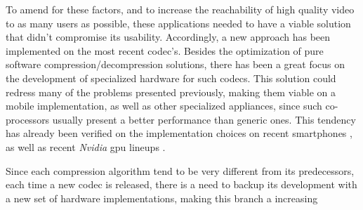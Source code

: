To amend for these factors, and to increase the reachability of high quality video to as many users as possible, these applications needed to have a viable solution that didn't compromise its usability. Accordingly, a new approach has been implemented on the most recent codec's. Besides the optimization of pure software compression/decompression solutions, there has been a great focus on the development of specialized hardware for such codecs. This solution could redress many of the problems presented previously, making them viable on a mobile implementation, as well as other specialized appliances, since such co-processors usually present a better performance than generic ones. This tendency has already been verified on the implementation choices on recent smartphones \cite[p.~14]{scientiamobileMobileOverviewReport}, as well as recent \textit{Nvidia} \gls{gpu} lineups \cite{VideoEncodeDecode2016}.



Since each compression algorithm tend to be very different from its predecessors, each time a new codec is released, there is a need to backup its development with a new set of hardware implementations, making this branch a increasing 

\printbibliography[heading=subbibliography]
